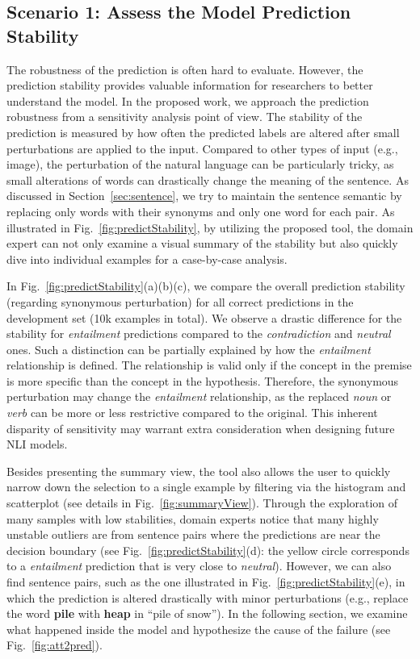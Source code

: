 \subsection{Scenario 1: Assess the Model Prediction Stability}
The robustness of the prediction is often hard to evaluate. However, the prediction stability provides valuable information for researchers to better understand the model.
%
In the proposed work, we approach the prediction robustness from a sensitivity analysis point of view. The stability of the prediction is measured by how often the predicted labels are altered after small perturbations are applied to the input.
%
Compared to other types of input (e.g., image), the perturbation of the natural language can be particularly tricky, as small alterations of words can drastically change the meaning of the sentence. As discussed in Section~\ref{sec:sentence}, we try to maintain the sentence semantic by replacing only words with their synonyms and only one word for each pair.
As illustrated in Fig.~\ref{fig:predictStability}, by utilizing the proposed tool, the domain expert can not only examine a visual summary of the stability but also quickly dive into individual examples for a case-by-case analysis.

In Fig.~\ref{fig:predictStability}(a)(b)(c), we compare the overall prediction stability (regarding synonymous perturbation) for all correct predictions in the development set (10k examples in total).
%
We observe a drastic difference for the stability for \emph{entailment} predictions compared to the \emph{contradiction} and \emph{neutral} ones.
%
Such a distinction can be partially explained by how the \emph{entailment} relationship is defined. The relationship is valid only if the concept in the premise is more specific than the concept in the hypothesis. Therefore, the synonymous perturbation may change the \emph{entailment} relationship, as the replaced \emph{noun} or \emph{verb} can be more or less restrictive compared to the original.
This inherent disparity of sensitivity may warrant extra consideration when designing future NLI models.

Besides presenting the summary view, the tool also allows the user to quickly narrow down the selection to a single example by filtering via the histogram and scatterplot (see details in Fig.~\ref{fig:summaryView}).
%
Through the exploration of many samples with low stabilities, domain experts notice that many highly unstable outliers are from sentence pairs where the predictions are near the decision boundary (see Fig.~\ref{fig:predictStability}(d): the yellow circle corresponds to a \emph{entailment} prediction that is very close to \emph{neutral}).
%
However, we can also find sentence pairs, such as the one illustrated in Fig.~\ref{fig:predictStability}(e), in which the prediction is altered drastically with minor perturbations (e.g., replace the word \textbf{pile} with \textbf{heap} in ``pile of snow''). In the following section, we examine what happened inside the model and hypothesize the cause of the failure (see Fig.~\ref{fig:att2pred}).


